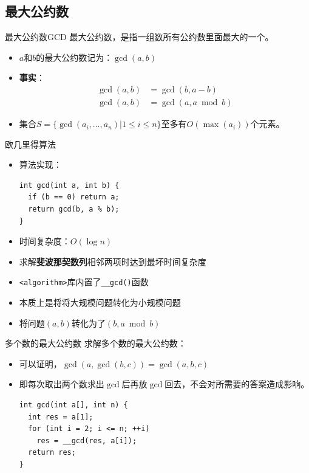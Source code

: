 \documentclass[9pt, c]{beamer}	%
\theoremstyle{plain}
\theoremstyle{definition}
\theoremstyle{remark}
\numberwithin{equation}{section}
\begin{document}
\subsection{最大公约数}
\begin{frame}[fragile]{最大公约数}{GCD}
  最大公约数，是指一组数所有公约数里面最大的一个。\vspace{0.1cm}
  \pause
  \begin{itemize}
    \item $a$和$b$的最大公约数记为：$\gcd(a, b)$
    \pause
    \item \textbf{事实}：
      $$
      \begin{aligned}
        \gcd(a,b)&=\gcd(b,a-b) \\ 
        \gcd(a,b)&=\gcd(a,a\bmod b)
      \end{aligned}
      $$
    \pause
    \item 集合$S=\{\gcd(a_i,\dots,a_n)|1 \leq i\leq n\}$至多有$O(\max(a_i))$个元素。
  \end{itemize}
\end{frame}

\begin{frame}[fragile]{欧几里得算法}
  \begin{itemize}
    \item 算法实现：
    \begin{lstlisting}
int gcd(int a, int b) {
  if (b == 0) return a;
  return gcd(b, a % b);
}
    \end{lstlisting}
    \item 时间复杂度：$O(\log{n})$
    \pause
    \item 求解\textbf{斐波那契数列}相邻两项时达到最坏时间复杂度
    \pause
    \item \lstinline|<algorithm>|库内置了\lstinline|__gcd()|函数
    \pause
    \item 本质上是将将大规模问题转化为小规模问题
    \item 将问题$(a,b)$转化为了$(b,a\bmod b)$
  \end{itemize}
\end{frame}

\begin{frame}[fragile]{多个数的最大公约数}
  求解多个数的最大公约数：
  \begin{itemize}
    \item 可以证明，$\gcd(a,\gcd(b,c))=\gcd(a,b,c)$
    \item 即每次取出两个数求出$\gcd$后再放$\gcd$回去，不会对所需要的答案造成影响。
    \pause
    \begin{lstlisting}
int gcd(int a[], int n) {
  int res = a[1];
  for (int i = 2; i <= n; ++i)
    res = __gcd(res, a[i]);
  return res;
}
    \end{lstlisting}
  \end{itemize}
\end{frame}
\end{document}

